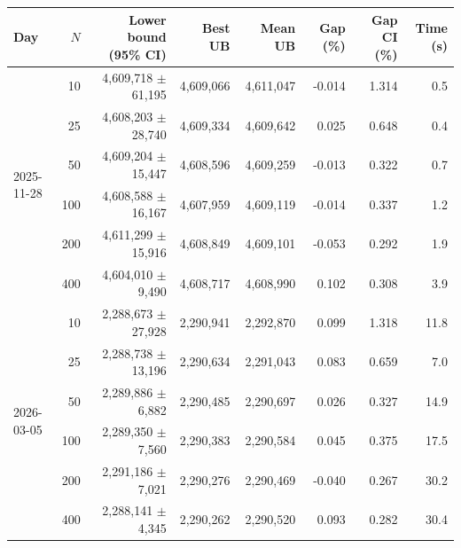 \begin{tabular}{@{}lrrrrrrr@{}}\toprule
Day & $N$ & Lower bound (95\% CI) & Best UB & Mean UB & Gap (\%) & Gap CI (\%) & Time (s) \\ \midrule
\multirow{6}{*}{2025-11-28} & 10 & 4{,}609{,}718 $\pm$ 61{,}195 & 4{,}609{,}066 & 4{,}611{,}047 & -0.014 & 1.314 & 0.5 \\
 & 25 & 4{,}608{,}203 $\pm$ 28{,}740 & 4{,}609{,}334 & 4{,}609{,}642 & 0.025 & 0.648 & 0.4 \\
 & 50 & 4{,}609{,}204 $\pm$ 15{,}447 & 4{,}608{,}596 & 4{,}609{,}259 & -0.013 & 0.322 & 0.7 \\
 & 100 & 4{,}608{,}588 $\pm$ 16{,}167 & 4{,}607{,}959 & 4{,}609{,}119 & -0.014 & 0.337 & 1.2 \\
 & 200 & 4{,}611{,}299 $\pm$ 15{,}916 & 4{,}608{,}849 & 4{,}609{,}101 & -0.053 & 0.292 & 1.9 \\
 & 400 & 4{,}604{,}010 $\pm$ 9{,}490 & 4{,}608{,}717 & 4{,}608{,}990 & 0.102 & 0.308 & 3.9 \\
\midrule
\multirow{6}{*}{2026-03-05} & 10 & 2{,}288{,}673 $\pm$ 27{,}928 & 2{,}290{,}941 & 2{,}292{,}870 & 0.099 & 1.318 & 11.8 \\
 & 25 & 2{,}288{,}738 $\pm$ 13{,}196 & 2{,}290{,}634 & 2{,}291{,}043 & 0.083 & 0.659 & 7.0 \\
 & 50 & 2{,}289{,}886 $\pm$ 6{,}882 & 2{,}290{,}485 & 2{,}290{,}697 & 0.026 & 0.327 & 14.9 \\
 & 100 & 2{,}289{,}350 $\pm$ 7{,}560 & 2{,}290{,}383 & 2{,}290{,}584 & 0.045 & 0.375 & 17.5 \\
 & 200 & 2{,}291{,}186 $\pm$ 7{,}021 & 2{,}290{,}276 & 2{,}290{,}469 & -0.040 & 0.267 & 30.2 \\
 & 400 & 2{,}288{,}141 $\pm$ 4{,}345 & 2{,}290{,}262 & 2{,}290{,}520 & 0.093 & 0.282 & 30.4 \\
\bottomrule\end{tabular}
